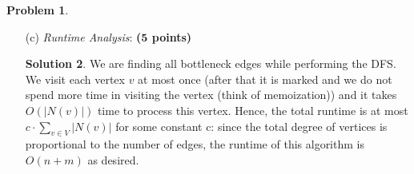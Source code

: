 \documentclass{article}
\theoremstyle{definition}
\newtheorem{problem}{Problem}
\newtheorem*{solution*}{Solution}
\newenvironment{solution}{\begin{solution*}}{{} \end{solution*}}
\newcommand{\grade}[1]{\hfill{\textbf{($\mathbf{#1}$ points)}}}
\begin{document}
\begin{problem}
\begin{enumerate}
\begin{solution}
\end{solution}

\bigskip

	\item[(c)] \emph{Runtime Analysis}: \grade{5} 
	
	
\begin{solution}

	We are finding all bottleneck edges while performing the DFS. We visit each vertex $v$ at most once (after that it is marked and we do not spend more time in visiting the vertex (think of memoization)) and it takes $O(|N(v)|)$ time to process this vertex. Hence, the total runtime is at most $c · \sum _{v \in V}|N(v)|$ for some constant c: since the total degree of vertices is proportional to the number of edges, the runtime of this algorithm is $O(n+m)$ as desired.

\end{solution}

\end{enumerate}
	
\end{problem} 

\newpage
\end{document}
